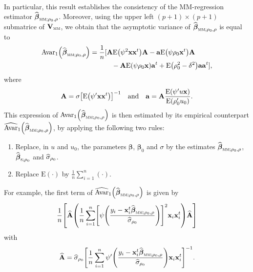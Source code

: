In particular, this result establishes the consistency of the MM-regression
estimator $\sthat{\boldsymbol\beta}_{\stsc{MM};\rho_{0},\rho}$.
Moreover, using the upper left $\left(  p+1\right)  \times(p+1)$ submatrice of
$\mathbf{V}_{\stsc{MM}}$, we obtain that the asymptotic variance of
$\sthat{\boldsymbol\beta}_{\stsc{MM};\rho_{0},\rho}$ is equal to
\begin{align*}
\mathrm{Avar}_{1}\left(  \sthat{\boldsymbol\beta}_{\stsc{MM};\rho
_{0},\rho}\right)   &  =\frac{1}{n}[\mathbf{A}\mathrm{E}\left(  \psi
^{2}\mathbf{xx}^{t}\right)  \mathbf{A}-\mathbf{a}\mathrm{E}\left(  \psi
\rho_{0}\stvec{x}^{t}\right)  \mathbf{A}\\
&  \,\ \ \ \ \ \ \ \ \ -\mathbf{A}\mathrm{E}\left(  \psi\rho_{0}%
\stvec{x}\right)  \mathbf{a}^{t}+\mathrm{E}\left(  \rho_{0}^{2}-\delta
^{2}\right)  \mathbf{aa}^{t}],
\end{align*}
where
\[
\mathbf{A}=\sigma\left[  \mathrm{E}\left(  \psi^{\prime}\mathbf{xx}%
^{t}\right)  \right]  ^{-1}\quad\text{and\quad}\mathbf{a}=\mathbf{A}%
\frac{\mathrm{E}\left(  \psi^{\prime}u\stvec{x}\right)  }{\mathrm{E}\left(
\rho_{0}^{\prime}u_{0}\right)  }.
\]
This expression of $\mathrm{Avar}_{1}\left(  \sthat{\boldsymbol\beta%
}_{\stsc{MM};\rho_{0},\rho}\right)  $ is then estimated by its empirical
counterpart $\sthat{\mathrm{Avar}}_{1}\left(  \sthat{\boldsymbol\beta%
}_{\stsc{MM};\rho_{0},\rho}\right)  $, by applying the following two rules:

\begin{enumerate}
\item Replace, in $u$ and $u_{0}$, the parameters $\boldsymbol\beta$,
$\boldsymbol\beta_{0}$ and $\sigma$ by the estimates $\widehat
{\boldsymbol\beta}_{\stsc{MM};\rho_{0},\rho}$, $\sthat{\boldsymbol{\beta
}}_{\stsc{S};\rho_{0}}$ and $\widehat{\sigma}_{\rho_{0}}$.

\item Replace $\mathrm{E}\left(  \cdot\right)  $ by $\frac{1}{n}\sum_{i=1}%
^{n}\left(  \cdot\right)  $.
\end{enumerate}

For example, the first term of $\sthat{\mathrm{Avar}}_{1}\left(
\sthat{\boldsymbol\beta}_{\stsc{MM};\rho_{0},\rho}\right)  $ is given
by
\[
\frac{1}{n}\left[  \sthat{\mathbf{A}}\left(  \frac{1}{n}\sum_{i=1}%
^{n}\left[  \psi\left(  \frac{y_{i}-\stvec{x}_{i}^{t}\widehat
{\boldsymbol\beta}_{\stsc{MM};\rho_{0},\rho}}{\sthat{\sigma}_{\rho_{0}}%
}\right)  \right]  ^{2}\stvec{x}_{i}\stvec{x}_{i}^{t}\right)  \widehat
{\mathbf{A}}\right]
\]
with
\[
\sthat{\mathbf{A}}=\sthat{\sigma}_{\rho_{0}}\left[  \frac{1}{n}\sum
_{i=1}^{n}\psi^{\prime}\left(  \frac{y_{i}-\stvec{x}_{i}^{t}\widehat
{\boldsymbol\beta}_{\stsc{MM};\rho_{0},\rho}}{\sthat{\sigma}_{\rho_{0}}%
}\right)  \stvec{x}_{i}\stvec{x}_{i}^{t}\right]  ^{-1}.
\]


